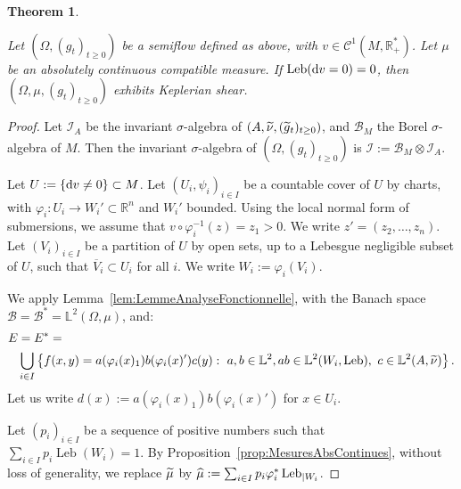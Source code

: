 \documentclass[10pt]{amsart}
\newtheorem{theo}{Theorem}[section]
\theoremstyle{definition}\newtheorem{defi}[theo]{Definition}\newtheorem{rema}[theo]{Remark}\newtheorem{exam}[theo]{Example}\newtheorem{exem}[theo]{Example}\newtheorem{nota}[theo]{Notation}
\DeclareMathOperator{\Leb}{Leb}
\newcommand{\R}{\mathbb{R}}
\newcommand{\Lbb}{\mathbb{L}}
\newcommand{\Bcal}{\mathcal{B}}
\newcommand{\Ccal}{\mathcal{C}}
\newcommand{\Ical}{\mathcal{I}}
\newcommand{\de}{{\rm d}}
\let\oldtilde\tilde
\renewcommand*{\tilde}[1]{\mathchoice{\widetilde{#1}}{\widetilde{#1}}{\oldtilde{#1}}{\oldtilde{#1}}}\let\oldhat\hat
\renewcommand*{\hat}[1]{\mathchoice{\widehat{#1}}{\widehat{#1}}{\oldhat{#1}}{\oldhat{#1}}}\let\oldforall\forall
\renewcommand*{\forall}{\mathrel{\oldforall}}
\begin{document}
\begin{theo}\label{thm:CisaillementSuspensions}

Let $(\Omega, (g_t)_{t \geq 0})$ be a semiflow defined as above, with $v \in \Ccal^1 (M, \R_+^*)$. Let $\mu$ be an absolutely continuous compatible measure. If $\Leb (\de v=0)\linebreak=0$, then $(\Omega, \mu, (g_t)_{t \geq 0})$ exhibits Keplerian shear.
\end{theo}



\begin{proof}
Let $\Ical_A$ be the invariant $\sigma$-algebra of $(A, \tilde{\nu}, (\tilde{g}_t)_{t \geq 0})$, and $\Bcal_M$ the Borel $\sigma$-algebra of $M$. Then the invariant $\sigma$-algebra of $(\Omega, (g_t)_{t \geq 0})$ is $\Ical := \Bcal_M \otimes \Ical_A$.


Let $U := \{\de v \neq 0\} \subset M$. Let $(U_i, \psi_i)_{i \in I}$ be a countable cover of $U$ by charts, with $\varphi_i : U_i \to W_i' \subset \R^n$ and $W_i'$ bounded. Using the local normal form of submersions, we assume that $v \circ \varphi_i^{-1} (z) = z_1>0$. We write $z' = (z_2, \ldots, z_n)$. Let $(V_i)_{i \in I}$ be a partition of $U$ by open sets, up to a Lebesgue negligible subset of $U$, such that $\overline{V}_i \subset U_i$ for all $i$. We write $W_i := \varphi_i (V_i)$.


We apply Lemma~\ref{lem:LemmeAnalyseFonctionnelle}, with the Banach space $\Bcal = \Bcal^* = \Lbb^2 (\Omega, \mu)$, and:
\begin{align*}
E & = E^* = \\
& \bigcup_{i \in I} \left\{f(x,y)=a (\varphi_i (x)_1) b (\varphi_i (x)') c(y) : \ a, b \in \Lbb^2, ab \in \Lbb^2 (W_i, \Leb), \ c \in \Lbb^2 (A, \tilde{\nu}) \right\}.
\end{align*}
Let us write $d(x):= a(\varphi_i (x)_1) b(\varphi_i (x)')$ for $x \in U_i$.


Let $(p_i)_{i \in I}$ be a sequence of positive numbers such that $\sum_{i \in I} p_i \Leb (W_i) = 1$. By Proposition~\ref{prop:MesuresAbsContinues}, without loss of generality, we replace $\tilde{\mu}$ by $\hat{\mu} := \sum_{i \in I} p_i \varphi_i^* \Leb_{|W_i}$.



\end{proof}
\end{document}
